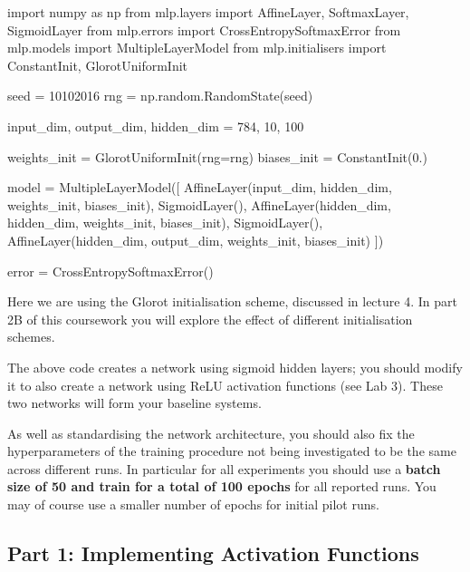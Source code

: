 \documentclass[11pt,]{article}
\newenvironment{Shaded}{}{}
\newcommand{\DecValTok}[1]{\textcolor[rgb]{0.25,0.63,0.44}{{#1}}}
\newcommand{\CharTok}[1]{\textcolor[rgb]{0.25,0.44,0.63}{{#1}}}
\newcommand{\NormalTok}[1]{{#1}}
\begin{document}
\begin{Shaded}
\begin{Highlighting}[]
\CharTok{import} \NormalTok{numpy }\CharTok{as} \NormalTok{np}
\CharTok{from} \NormalTok{mlp.layers }\CharTok{import} \NormalTok{AffineLayer, SoftmaxLayer, SigmoidLayer}
\CharTok{from} \NormalTok{mlp.errors }\CharTok{import} \NormalTok{CrossEntropySoftmaxError}
\CharTok{from} \NormalTok{mlp.models }\CharTok{import} \NormalTok{MultipleLayerModel}
\CharTok{from} \NormalTok{mlp.initialisers }\CharTok{import} \NormalTok{ConstantInit, GlorotUniformInit}

\NormalTok{seed = }\DecValTok{10102016}
\NormalTok{rng = np.random.RandomState(seed)}

\NormalTok{input_dim, output_dim, hidden_dim = }\DecValTok{784}\NormalTok{, }\DecValTok{10}\NormalTok{, }\DecValTok{100}

\NormalTok{weights_init = GlorotUniformInit(rng=rng)}
\NormalTok{biases_init = ConstantInit(}\DecValTok{0}\NormalTok{.)}

\NormalTok{model = MultipleLayerModel([}
    \NormalTok{AffineLayer(input_dim, hidden_dim, weights_init, biases_init),}
    \NormalTok{SigmoidLayer(),}
    \NormalTok{AffineLayer(hidden_dim, hidden_dim, weights_init, biases_init),}
    \NormalTok{SigmoidLayer(),}
    \NormalTok{AffineLayer(hidden_dim, output_dim, weights_init, biases_init)}
\NormalTok{])}

\NormalTok{error = CrossEntropySoftmaxError()}
\end{Highlighting}
\end{Shaded}

Here we are using the Glorot initialisation scheme, discussed in lecture 4.  In part 2B of this coursework you will explore the effect of different initialisation schemes.

The above code creates a network using sigmoid hidden layers; you should modify it to also create a network using ReLU activation functions (see Lab 3).  These two networks will form your baseline systems.

As well as standardising the network architecture, you should also fix
the hyperparameters of the training procedure not being investigated to
be the same across different runs. In particular for all experiments you
should use a \textbf{batch size of 50 and train for a total of 100
epochs} for all reported runs. You may of course use a smaller number of
epochs for initial pilot runs.

\subsection{Part 1: Implementing Activation Functions}
\label{sec:actfns}
\end{document}
